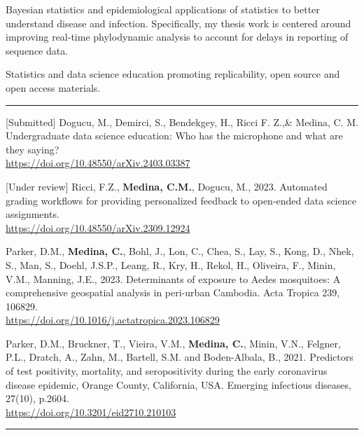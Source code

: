 \documentclass{article}
\begin{document}


\begin{description}
	\vspace{-2mm}
	\item[Research Interests]\hspace*{.1in}
		
		Bayesian statistics and epidemiological applications of statistics to better understand disease and infection. Specifically, my thesis work is centered around improving real-time phylodynamic analysis to account for delays in reporting of sequence data.
		
		Statistics and data science education promoting replicability, open source and open access materials.
		
\end{description}
\vspace{-2mm}
\rule{\linewidth}{1pt}




\begin{description}
	\vspace{-2mm}
	\item[Under preparation / Pre-prints]\hspace*{.1in}
	
		[Submitted] Dogucu, M., Demirci, S., Bendekgey, H., Ricci F. Z.,\& Medina, C. M. Undergraduate data science education: Who has the microphone and what are they saying?\\ \url{https://doi.org/10.48550/arXiv.2403.03387}
		
		[Under review] Ricci, F.Z., \textbf{Medina, C.M.}, Dogucu, M., 2023. Automated grading workflows for providing personalized feedback to open-ended data science assignments.\\  \url{https://doi.org/10.48550/arXiv.2309.12924}
		
	\item[Peer-Reviewed Publications]\hspace*{.1in}
		
		Parker, D.M., \textbf{Medina, C.}, Bohl, J., Lon, C., Chea, S., Lay, S., Kong, D., Nhek, S., Man, S., Doehl, J.S.P., Leang, R., Kry, H., Rekol, H., Oliveira, F., Minin, V.M., Manning, J.E., 2023. Determinants of exposure to Aedes mosquitoes: A comprehensive geospatial analysis in peri-urban Cambodia. Acta Tropica 239, 106829.\\ 
		\url{https://doi.org/10.1016/j.actatropica.2023.106829}
		
		Parker, D.M., Bruckner, T., Vieira, V.M., \textbf{Medina, C.}, Minin, V.N., Felgner, P.L., Dratch, A., Zahn, M., Bartell, S.M. and Boden-Albala, B., 2021. Predictors of test positivity, mortality, and seropositivity during the early coronavirus disease epidemic, Orange County, California, USA. Emerging infectious diseases, 27(10), p.2604.\\ \url{https://doi.org/10.3201/eid2710.210103}

\end{description}
\vspace{-2mm}
\rule{\linewidth}{1pt}
\end{document}
